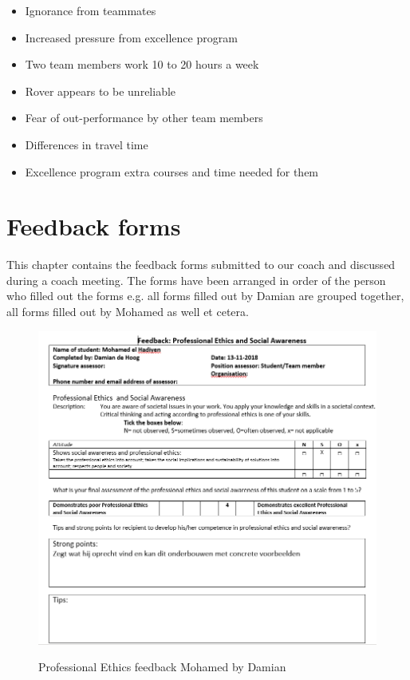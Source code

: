 \documentclass[12pt]{article}
\begin{document}
\begin{tcbitemize}[raster columns=3, raster rows=3, enhanced, sharp corners, raster equal height=rows, raster force size=false, raster column skip=0pt, raster row skip = 0pt]
		\tcbitem[swotbox=T]
		\begin{itemize}
			\item Ignorance from teammates
			\item Increased pressure from excellence program
			\item Two team members work 10 to 20 hours a week
			\item Rover appears to be unreliable
			\item Fear of out-performance by other team members
			\item Differences in travel time
			\item Excellence program extra courses and time needed for them
		\end{itemize}
	\end{tcbitemize}
	\newpage
	\section{Feedback forms}
	This chapter contains the feedback forms submitted to our coach and discussed during a coach meeting. The forms have been arranged in order of the person who filled out the forms e.g. all forms filled out by Damian are grouped together, all forms filled out by Mohamed as well et cetera.
	\begin{figure}[h]
		\centering
		\includegraphics[width=\columnwidth]{ProfEthMohamed.PNG}\\
		\caption{Professional Ethics feedback Mohamed by Damian}
	\end{figure}
\end{document}
